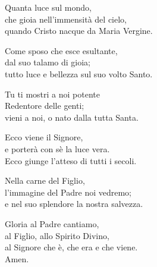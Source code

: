 
\strofa Quanta luce sul mondo,\\
che gioia nell'immensità del cielo,\\
quando Cristo nacque da Maria Vergine.

\spazio

\strofa Come sposo che esce esultante,\\
dal suo talamo di gioia;\\
tutto luce e bellezza sul suo volto Santo.

\spazio

\strofa Tu ti mostri a noi potente\\
Redentore delle genti;\\
vieni a noi, o nato dalla tutta Santa.

\spazio

\strofa Ecco viene il Signore,\\
e porterà con sè la luce vera.\\
Ecco giunge l'atteso di tutti i secoli.

\spazio

\strofa Nella carne del Figlio,\\
l'immagine del Padre noi vedremo;\\
e nel suo splendore la nostra salvezza.

\spazio

\strofa Gloria al Padre cantiamo,\\
al Figlio, allo Spirito Divino,\\
al Signore che è, che era e che viene.\\
Amen.